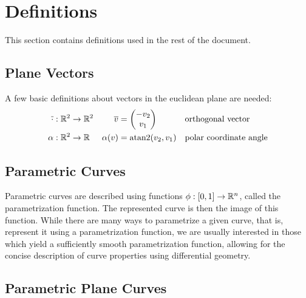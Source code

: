 \documentclass[a4paper]{article}
\begin{document}
	\clearpage

	\appendix

	\section{Definitions}
	\label{section:definitions}

		This section contains definitions used in the rest of the document.

		\subsection{Plane Vectors}
		\label{section:plane_vectors}

			A few basic definitions about vectors in the euclidean plane are needed:
			\begin{align*}
				\overline{\cdot} & : \function{\R{2}}{\R{2}} & \overline{v}      & = \vectorB{-v_2}{v_1}      && \text{orthogonal vector}\\
				\alpha           & : \function{\R{2}}{\RR}   & \apply{\alpha}{v} & = \apply{\atan2}{v_2, v_1} && \text{polar coordinate angle}
			\end{align*}

		\subsection{Parametric Curves}
		\label{section:parametric_curves}

			Parametric curves are described using functions \(\phi : \left[ 0,1 \right] \rightarrow \mathbb{R}^{n}\), called the parametrization function. The represented curve is then the image of this function. While there are many ways to parametrize a given curve, that is, represent it using a parametrization function, we are usually interested in those which yield a sufficiently smooth parametrization function, allowing for the concise description of curve properties using differential geometry.

		\subsection{Parametric Plane Curves}
		\label{section:parametric_plane_curves}
\end{document}
